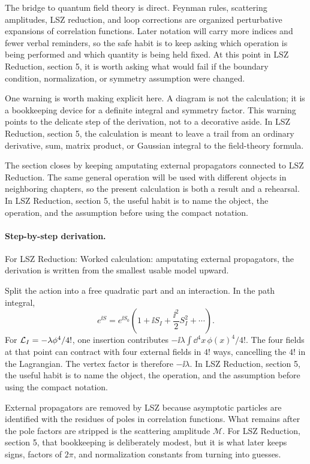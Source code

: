 The bridge to quantum field theory is direct.  Feynman rules, scattering amplitudes, LSZ reduction, and loop corrections are organized perturbative expansions of correlation functions.  Later notation will carry more indices and fewer verbal reminders, so the safe habit is to keep asking which operation is being performed and which quantity is being held fixed.  At this point in LSZ Reduction, section 5, it is worth asking what would fail if the boundary condition, normalization, or symmetry assumption were changed.

One warning is worth making explicit here.  A diagram is not the calculation; it is a bookkeeping device for a definite integral and symmetry factor.  This warning points to the delicate step of the derivation, not to a decorative aside.  In LSZ Reduction, section 5, the calculation is meant to leave a trail from an ordinary derivative, sum, matrix product, or Gaussian integral to the field-theory formula.

The section closes by keeping amputating external propagators connected to LSZ Reduction.  The same general operation will be used with different objects in neighboring chapters, so the present calculation is both a result and a rehearsal.  In LSZ Reduction, section 5, the useful habit is to name the object, the operation, and the assumption before using the compact notation.



\paragraph{Step-by-step derivation.}

For LSZ Reduction: Worked calculation: amputating external propagators, the derivation is written from the smallest usable model upward.

Split the action into a free quadratic part and an interaction.  In the path integral,
\[
  e^{\ii S}=e^{\ii S_0}\left(1+\ii S_I+\frac{\ii^2}{2}S_I^2+\cdots\right).
\]
For \(\mathcal L_I=-\lambda\phi^4/4!\), one insertion contributes \(-\ii\lambda\int\dd^4x\,\phi(x)^4/4!\).  The four fields at that point can contract with four external fields in \(4!\) ways, cancelling the \(4!\) in the Lagrangian.  The vertex factor is therefore \(-\ii\lambda\).  In LSZ Reduction, section 5, the useful habit is to name the object, the operation, and the assumption before using the compact notation.

External propagators are removed by LSZ because asymptotic particles are identified with the residues of poles in correlation functions.  What remains after the pole factors are stripped is the scattering amplitude \(\mathcal M\).  For LSZ Reduction, section 5, that bookkeeping is deliberately modest, but it is what later keeps signs, factors of \(2\pi\), and normalization constants from turning into guesses.

